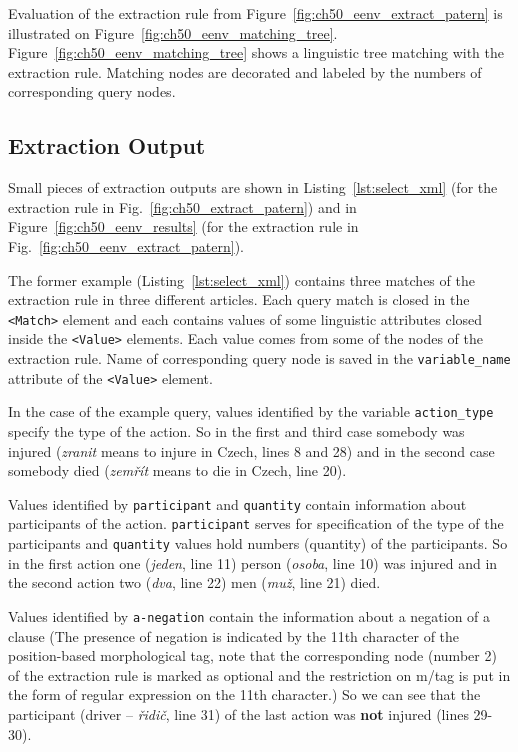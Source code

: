 Evaluation of the extraction rule from Figure~\ref{fig:ch50_eenv_extract_patern} is illustrated on Figure~\ref{fig:ch50_eenv_matching_tree}. Figure~\ref{fig:ch50_eenv_matching_tree} shows a linguistic tree matching with the extraction rule. Matching nodes are decorated and labeled by the numbers of corresponding query nodes.


\subsection{Extraction Output}

Small pieces of extraction outputs are shown in Listing~\ref{lst:select_xml} (for the extraction rule in Fig.~\ref{fig:ch50_extract_patern}) and in Figure~\ref{fig:ch50_eenv_results} (for the extraction rule in Fig.~\ref{fig:ch50_eenv_extract_patern}). 

The former example (Listing~\ref{lst:select_xml}) contains three matches of the extraction rule in three different articles. Each query match is closed in the \verb+<Match>+ element and each contains values of some linguistic attributes closed inside the \verb+<Value>+ elements. Each value comes from some of the nodes of the extraction rule. Name of corresponding query node is saved in the \verb+variable_name+ attribute of the \verb+<Value>+ element.

In the case of the example query, values identified by the variable \verb+action_type+ specify the type of the action. So in the first and third case somebody was injured (\emph{zranit} means to injure in Czech, lines 8 and 28) and in the second case somebody died (\emph{zemřít} means to die in Czech, line 20).

Values identified by \verb+participant+ and \verb+quantity+ contain information about participants of the action. \verb+participant+ serves for specification of the type of the participants and \verb+quantity+ values hold numbers (quantity) of the participants. So in the first action one (\emph{jeden}, line 11) person (\emph{osoba}, line 10) was injured and in the second action two (\emph{dva}, line 22) men (\emph{muž}, line 21) died.

Values identified by \verb+a-negation+ contain the information about a negation of a clause (The presence of negation is indicated by the 11th character of the position-based morphological tag, note that the corresponding node (number 2) of the extraction rule is marked as optional and the restriction on m/tag is put in the form of regular expression on the 11th character.) So we can see that the participant (driver -- \emph{řidič}, line 31) of the last action was \textbf{not} injured (lines 29-30).

